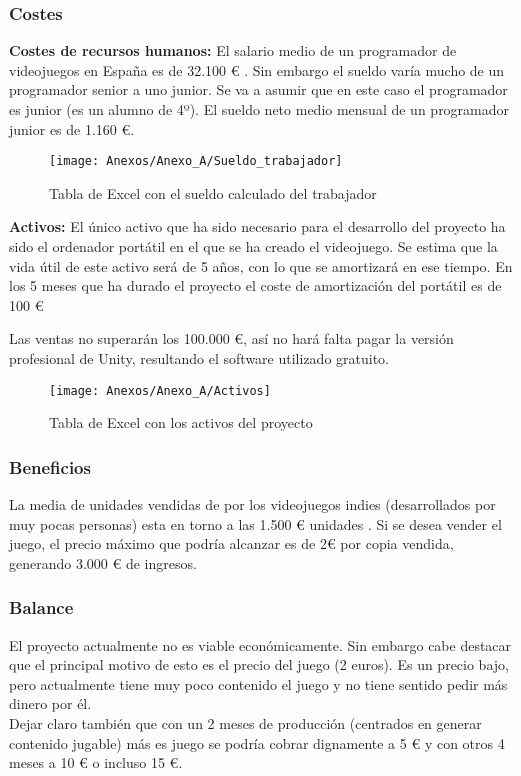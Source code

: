 \subsubsection{Costes}
\textbf{Costes de recursos humanos:}
El salario medio de un programador de videojuegos en España es de 32.100 € \cite{Sueldo}. Sin embargo el sueldo varía mucho de un programador senior a uno junior. Se va a asumir que en este caso el programador es junior (es un alumno de 4º). El sueldo neto medio mensual de un programador junior es de 1.160 €.

\begin{figure}[h]
\centering
\texttt{[image: Anexos/Anexo\_A/Sueldo\_trabajador]}
\caption{Tabla de Excel con el sueldo calculado del trabajador}
\end{figure}

\textbf{Activos:}
El único activo que ha sido necesario para el desarrollo del proyecto ha sido el ordenador portátil en el que se ha creado el videojuego. Se estima que la vida útil de este activo será de 5 años, con lo que se amortizará en ese tiempo. En los 5 meses que ha durado el proyecto el coste de amortización del portátil es de 100 €

Las ventas no superarán los 100.000 €, así no hará falta pagar la versión profesional de Unity, resultando el software utilizado gratuito.

\begin{figure}[h]
\centering
\texttt{[image: Anexos/Anexo\_A/Activos]}
\caption{Tabla de Excel con los activos del proyecto}
\end{figure}

\subsubsection{Beneficios}
La media de unidades vendidas de por los videojuegos indies (desarrollados por muy pocas personas) esta en torno a las 1.500 € unidades \cite{Unidades}. Si se desea vender el juego, el precio máximo que podría alcanzar es de 2€ por copia vendida, generando 3.000 € de ingresos.

\subsubsection{Balance}
El proyecto actualmente no es viable económicamente. Sin embargo cabe destacar que el principal motivo de esto es el precio del juego (2 euros). Es un precio bajo, pero actualmente tiene muy poco contenido el juego y no tiene sentido pedir más dinero por él.\\
Dejar claro también que con un 2 meses de producción (centrados en generar contenido jugable) más es juego se podría cobrar dignamente a 5 € y con otros 4 meses a 10 € o incluso 15 €.

